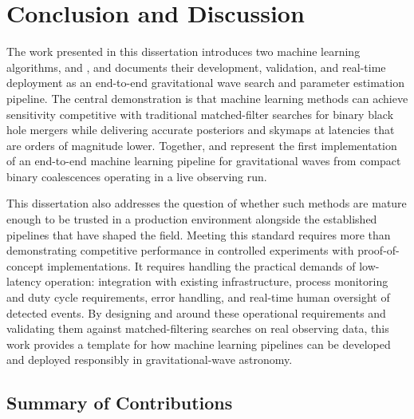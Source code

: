 \chapter{Conclusion and Discussion}
\label{conclusion_chapter}

The work presented in this dissertation introduces two machine learning algorithms, \aframe and \amplfi, and documents their development, validation, and real-time deployment as an end-to-end gravitational wave search and parameter estimation pipeline.
The central demonstration is that machine learning methods can achieve sensitivity competitive with traditional matched-filter searches for binary black hole mergers while delivering accurate posteriors and skymaps at latencies that are orders of magnitude lower.
Together, \aframe and \amplfi represent the first implementation of an end-to-end machine learning pipeline for gravitational waves from compact binary coalescences operating in a live observing run.

This dissertation also addresses the question of whether such methods are mature enough to be trusted in a production environment alongside the established pipelines that have shaped the field.
Meeting this standard requires more than demonstrating competitive performance in controlled experiments with proof-of-concept implementations.
It requires handling the practical demands of low-latency operation: integration with existing infrastructure, process monitoring and duty cycle requirements, error handling, and real-time human oversight of detected events.
By designing \aframe and \amplfi around these operational requirements and validating them against matched-filtering searches on real observing data, this work provides a template for how machine learning pipelines can be developed and deployed responsibly in gravitational-wave astronomy.

\section{Summary of Contributions}

